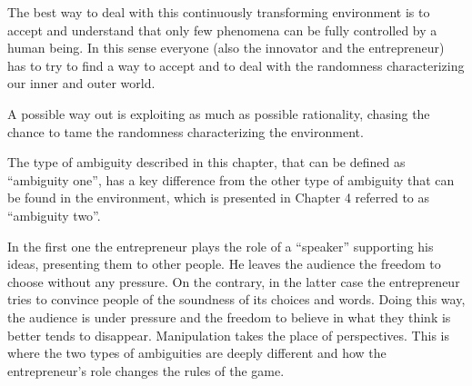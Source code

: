 The best way to deal with this continuously transforming environment is to accept and understand that only few phenomena can be fully controlled by a human being. In this sense everyone (also the innovator and the entrepreneur) has to try to find a way to accept and to deal with the randomness characterizing our inner and outer world.

A possible way out is exploiting as much as possible rationality, chasing the chance to tame the randomness characterizing the environment.

The type of ambiguity described in this chapter, that can be defined as “ambiguity one”, has a key difference from the other type of ambiguity that can be found in the environment, which is presented in Chapter 4 referred to as “ambiguity two”.

In the first one the entrepreneur plays the role of a “speaker” supporting his ideas, presenting them to other people. He leaves the audience the freedom to choose without any pressure. On the contrary, in the latter case the entrepreneur tries to convince people of the soundness of its choices and words. Doing this way, the audience is under pressure and the freedom to believe in what they think is better tends to disappear. Manipulation takes the place of perspectives. This is where the two types of ambiguities are deeply different and how the entrepreneur’s role changes the rules of the game.
